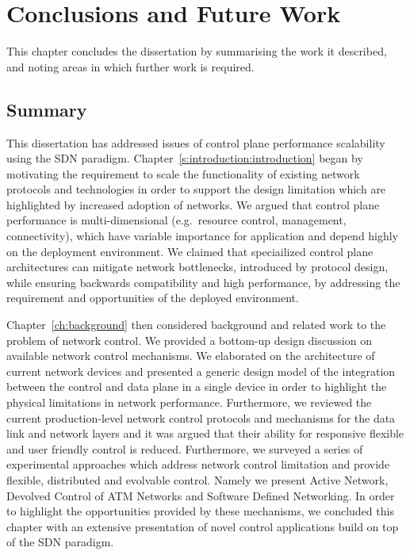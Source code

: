 \def\baselinestretch{1}
\chapter{Conclusions and Future Work} \label{sec:conclusions}

\def\baselinestretch{1.66}

This chapter concludes the dissertation by summarising the work it described,
and noting areas in which further work is required.

\section{Summary}

This dissertation has addressed issues of control plane performance scalability
using the SDN paradigm.  Chapter~\ref{s:introduction:introduction} began by
motivating the requirement to scale the functionality of existing network
protocols and technologies in order to support the design limitation which are
highlighted by increased adoption of networks.  We argued that control plane
performance is multi-dimensional (e.g.~resource control, management,
connectivity), which have variable importance for application and depend highly
on the deployment environment. We claimed that speciailized control plane
architectures can mitigate network bottlenecks, introduced by protocol design,
while ensuring backwards compatibility and high performance, by addressing the
requirement and opportunities of the deployed environment. 

Chapter~\ref{ch:background} then considered background and related work to the
problem of network control. We provided a bottom-up design discussion on
available network control mechanisms. We elaborated on the architecture of
current network devices and presented a generic design model of the integration
between the control and data plane in a single device in order to highlight the
physical limitations in  network performance. Furthermore, we reviewed
the current production-level network control protocols and mechanisms for the
data link and network layers and it was argued that their ability for responsive
flexible and user friendly control is reduced. Furthermore, we surveyed a
series of experimental approaches which address network control limitation and
provide flexible, distributed and evolvable control.  Namely we present Active
Network, Devolved Control of ATM Networks and Software Defined Networking. In
order to highlight the opportunities provided by these mechanisms, we concluded
this chapter with an extensive presentation of novel control applications build
on top of the SDN paradigm. 

